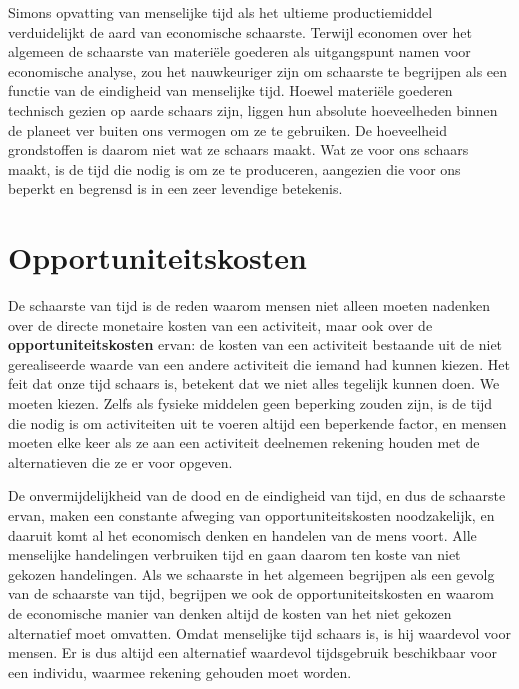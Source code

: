 Simons opvatting van menselijke tijd als het ultieme productiemiddel
verduidelijkt de aard van economische schaarste. Terwijl economen over
het algemeen de schaarste van materiële goederen als uitgangspunt namen
voor economische analyse, zou het nauwkeuriger zijn om schaarste te
begrijpen als een functie van de eindigheid van menselijke tijd. Hoewel
materiële goederen technisch gezien op aarde schaars zijn, liggen hun
absolute hoeveelheden binnen de planeet ver buiten ons vermogen om ze te
gebruiken. De hoeveelheid grondstoffen is daarom niet wat ze schaars
maakt. Wat ze voor ons schaars maakt, is de tijd die nodig is om ze te
produceren, aangezien die voor ons beperkt en begrensd is in een zeer
levendige betekenis.

\section{Opportuniteitskosten}

De schaarste van tijd is de reden waarom mensen niet alleen moeten
nadenken over de directe monetaire kosten van een activiteit, maar ook
over de \textbf{opportuniteitskosten} ervan: de
kosten van een activiteit bestaande uit de niet gerealiseerde waarde van
een andere activiteit die iemand had kunnen kiezen. Het feit dat onze
tijd schaars is, betekent dat we niet alles tegelijk kunnen doen. We
moeten kiezen. Zelfs als fysieke middelen geen beperking zouden zijn, is
de tijd die nodig is om activiteiten uit te voeren altijd een beperkende
factor, en mensen moeten elke keer als ze aan een activiteit deelnemen
rekening houden met de alternatieven die ze er voor opgeven.

De onvermijdelijkheid van de dood en de eindigheid van tijd, en dus de
schaarste ervan, maken een constante afweging van opportuniteitskosten
noodzakelijk, en daaruit komt al het economisch denken en handelen van
de mens voort. Alle menselijke handelingen verbruiken tijd en gaan
daarom ten koste van niet gekozen handelingen. Als we schaarste in het
algemeen begrijpen als een gevolg van de schaarste van tijd, begrijpen
we ook de opportuniteitskosten en waarom de economische manier van
denken altijd de kosten van het niet gekozen alternatief moet omvatten.
Omdat menselijke tijd schaars is, is hij waardevol voor mensen. Er is
dus altijd een alternatief waardevol tijdsgebruik beschikbaar voor een
individu, waarmee rekening gehouden moet worden.

